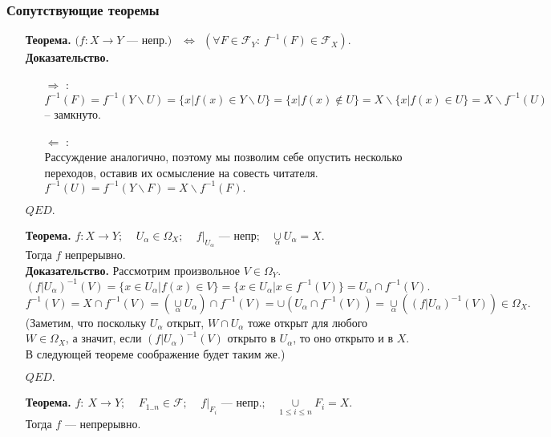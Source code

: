 \documentclass[10pt]{report}
\begin{document}
\begin{spacing}{1.5}
\subsubsection{Сопутствующие теоремы}
\begin{enumerate}
\item[\textbf{Теорема.}] $(f: X\rightarrow Y$ --- непр.$)$  $~~\Longleftrightarrow~~(\forall F\in\mathcal{F}_{Y}:~f^{-1}(F)\in\mathcal{F}_{X}).$\\
\textbf{Доказательство.}
\begin{enumerate}
\item[\underline{$\Rightarrow$}]:\\ 
$f^{-1}(F)=f^{-1}(Y\backslash U)=\lbrace x\vert f(x)\in Y\backslash U\rbrace=\lbrace x\vert f(x)\notin U\rbrace =X\backslash\lbrace x\vert f(x)\in U\rbrace=X\backslash f^{-1}(U)$ -- замкнуто.
\item[\underline{$\Leftarrow$}]:\\
Рассуждение аналогично, поэтому мы позволим себе опустить несколько переходов, оставив их осмысление на совесть читателя.\\
$f^{-1}(U)= f^{-1}(Y\backslash F)=X\backslash f^{-1}(F).$ 
\end{enumerate}
\begin{flushright}
$QED.$
\end{flushright}
\item[\textbf{Теорема.}] $f:X\rightarrow Y;~~~~~U_{\alpha}\in\Omega_{X};~~~~~f\vert_{U_{\alpha}}\text{ --- непр};~~~~\underset{\alpha}{\cup}U_{\alpha}=X.$\\
Тогда $f$ непрерывно.\\
\textbf{Доказательство.}
Рассмотрим произвольное $V\in \Omega_{Y}.$\\
$(f\vert U_{\alpha})^{-1}(V)=\lbrace x\in U_{\alpha}| f(x)\in V\rbrace = \lbrace x\in U_{\alpha}\vert x\in f^{-1}(V)\rbrace = U_{\alpha}\cap f^{-1}(V).$\\
$f^{-1}(V)=X\cap f^{-1}(V) = (\underset{\alpha}{\cup}U_{\alpha})\cap f^{-1}(V) = \cup(U_{\alpha}\cap f^{-1}(V)) = \underset{\alpha}{\cup}((f\vert U_{\alpha})^{-1}(V))\in\Omega_{X}.$
(Заметим, что поскольку $U_{\alpha}$ открыт, $W\cap U_{\alpha}$ тоже открыт для любого $W\in \Omega_{X}$, а значит, если $(f\vert U_{\alpha})^{-1}(V)$ открыто в $U_{\alpha}$, то оно открыто и в $X$. В следующей теореме соображение будет таким же.)
\begin{flushright}
$QED.$
\end{flushright}
\item[\textbf{Теорема.}] $f:~X\rightarrow Y;~~~~~F_{1..n}\in \mathcal{F};~~~~~f\vert_{F_{i}}\text{ --- непр.};~~~~\underset{1\leq i\leq n}{\cup} F_{i}=X.$\\
Тогда $f$ --- непрерывно.\\


\end{enumerate}
\end{spacing}
\end{document}

